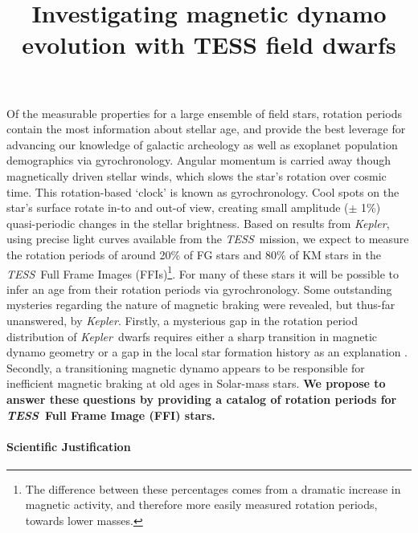 \documentclass[letterpaper,12pt,preprint]{hack_aastex}
\newcommand{\Kepler}{{\it Kepler}}
\newcommand{\kepler}{\Kepler}
\newcommand{\TESS}{{\it TESS}}
\newcommand{\tess}{{\it TESS}}
\begin{document}
\title{Investigating magnetic dynamo evolution with TESS field dwarfs}

Of the measurable properties for a large ensemble of field stars, rotation
periods contain the most information about stellar age, and provide the best
leverage for advancing our knowledge of galactic archeology as well as
exoplanet population demographics via gyrochronology.
Angular momentum is carried away though magnetically driven stellar winds,
which slows the star's rotation over cosmic time.
This rotation-based `clock' is known as gyrochronology.
Cool spots on the star's surface rotate in-to and out-of view, creating small
amplitude ($\pm$ 1\%) quasi-periodic changes in the stellar brightness.
Based on results from \Kepler, using precise light curves available from the
\TESS\ mission, we expect to measure the rotation periods of around 20\% of FG
stars and 80\% of KM stars in the \tess\ Full Frame Images (FFIs)\footnote{The
difference between these percentages comes from a dramatic increase in
magnetic activity, and therefore more easily measured rotation periods,
towards lower masses.}.
For many of these stars it will be possible to infer an age from their
rotation periods via gyrochronology.
Some outstanding mysteries regarding the nature of magnetic braking were
revealed, but thus-far unanswered, by \kepler.
Firstly, a mysterious gap in the rotation period distribution of \Kepler\
dwarfs requires either a sharp transition in magnetic dynamo geometry or a gap
in the local star formation history as an explanation \citep{mcquillan2014,
davenport2017}.
Secondly, a transitioning magnetic dynamo appears to be responsible for
inefficient magnetic braking at old ages in Solar-mass stars.
{\bf We propose to answer these questions by providing a catalog of
rotation periods for \TESS\ Full Frame Image (FFI) stars.}

\paragraph{Scientific Justification}
\end{document}
